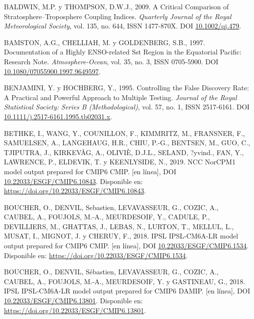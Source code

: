 \documentclass[12pt,oneside,a4paper]{reedthesis}
\newlength{\cslhangindent}
\newenvironment{CSLReferences}[2] %
 {%
  \setlength{\parindent}{0pt}
  \ifodd #1 \everypar{\setlength{\hangindent}{\cslhangindent}}\ignorespaces\fi
  \ifnum #2 > 0
  \setlength{\parskip}{#2\baselineskip}
  \fi
 }%
 {}
\begin{document}
\begin{CSLReferences}{1}{0}
\leavevmode{}%
BALDWIN, M.P. y THOMPSON, D.W.J., 2009. A Critical Comparison of Stratosphere--Troposphere Coupling Indices. \emph{Quarterly Journal of the Royal Meteorological Society}, vol. 135, no. 644, ISSN 1477-870X. DOI \href{https://doi.org/10.1002/qj.479}{10.1002/qj.479}.

\leavevmode{}%
BAMSTON, A.G., CHELLIAH, M. y GOLDENBERG, S.B., 1997. Documentation of a Highly {ENSO}-related Sst Region in the Equatorial Pacific: {Research} Note. \emph{Atmosphere-Ocean}, vol. 35, no. 3, ISSN 0705-5900. DOI \href{https://doi.org/10.1080/07055900.1997.9649597}{10.1080/07055900.1997.9649597}.

\leavevmode{}%
BENJAMINI, Y. y HOCHBERG, Y., 1995. Controlling the {False Discovery Rate}: {A Practical} and {Powerful Approach} to {Multiple Testing}. \emph{Journal of the Royal Statistical Society: Series B (Methodological)}, vol. 57, no. 1, ISSN 2517-6161. DOI \href{https://doi.org/10.1111/j.2517-6161.1995.tb02031.x}{10.1111/j.2517-6161.1995.tb02031.x}.

\leavevmode{}%
BETHKE, I., WANG, Y., COUNILLON, F., KIMMRITZ, M., FRANSNER, F., SAMUELSEN, A., LANGEHAUG, H.R., CHIU, P.-G., BENTSEN, M., GUO, C., TJIPUTRA, J., KIRKEVÅG, A., OLIVIÈ, D.J.L., SELAND, ?yvind., FAN, Y., LAWRENCE, P., ELDEVIK, T. y KEENLYSIDE, N., 2019. NCC NorCPM1 model output prepared for CMIP6 CMIP. {[}en línea{]}, DOI \href{https://doi.org/10.22033/ESGF/CMIP6.10843}{10.22033/ESGF/CMIP6.10843}. Disponible en: \url{https://doi.org/10.22033/ESGF/CMIP6.10843}.

\leavevmode{}%
BOUCHER, O., DENVIL, Sebastien, LEVAVASSEUR, G., COZIC, A., CAUBEL, A., FOUJOLS, M.-A., MEURDESOIF, Y., CADULE, P., DEVILLIERS, M., GHATTAS, J., LEBAS, N., LURTON, T., MELLUL, L., MUSAT, I., MIGNOT, J. y CHERUY, F., 2018. IPSL IPSL-CM6A-LR model output prepared for CMIP6 CMIP. {[}en línea{]}, DOI \href{https://doi.org/10.22033/ESGF/CMIP6.1534}{10.22033/ESGF/CMIP6.1534}. Disponible en: \url{https://doi.org/10.22033/ESGF/CMIP6.1534}.

\leavevmode{}%
BOUCHER, O., DENVIL, Sébastien, LEVAVASSEUR, G., COZIC, A., CAUBEL, A., FOUJOLS, M.-A., MEURDESOIF, Y. y GASTINEAU, G., 2018. IPSL IPSL-CM6A-LR model output prepared for CMIP6 DAMIP. {[}en línea{]}, DOI \href{https://doi.org/10.22033/ESGF/CMIP6.13801}{10.22033/ESGF/CMIP6.13801}. Disponible en: \url{https://doi.org/10.22033/ESGF/CMIP6.13801}.


\end{CSLReferences}
\end{document}
